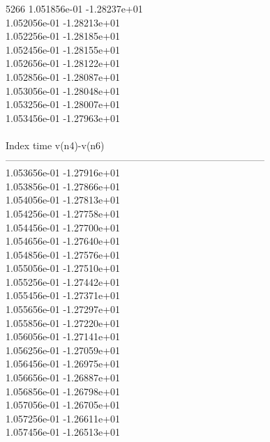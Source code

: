 5266	1.051856e-01	-1.28237e+01	\\ 	1.052056e-01	-1.28213e+01	\\ 	1.052256e-01	-1.28185e+01	\\ 	1.052456e-01	-1.28155e+01	\\ 	1.052656e-01	-1.28122e+01	\\ 	1.052856e-01	-1.28087e+01	\\ 	1.053056e-01	-1.28048e+01	\\ 	1.053256e-01	-1.28007e+01	\\ 	1.053456e-01	-1.27963e+01	\\ \hline
\\ \hline
Index   time            v(n4)-v(n6)     \\ \hline
--------------------------------------------------------------------------------\\ 	1.053656e-01	-1.27916e+01	\\ 	1.053856e-01	-1.27866e+01	\\ 	1.054056e-01	-1.27813e+01	\\ 	1.054256e-01	-1.27758e+01	\\ 	1.054456e-01	-1.27700e+01	\\ 	1.054656e-01	-1.27640e+01	\\ 	1.054856e-01	-1.27576e+01	\\ 	1.055056e-01	-1.27510e+01	\\ 	1.055256e-01	-1.27442e+01	\\ 	1.055456e-01	-1.27371e+01	\\ 	1.055656e-01	-1.27297e+01	\\ 	1.055856e-01	-1.27220e+01	\\ 	1.056056e-01	-1.27141e+01	\\ 	1.056256e-01	-1.27059e+01	\\ 	1.056456e-01	-1.26975e+01	\\ 	1.056656e-01	-1.26887e+01	\\ 	1.056856e-01	-1.26798e+01	\\ 	1.057056e-01	-1.26705e+01	\\ 	1.057256e-01	-1.26611e+01	\\ 	1.057456e-01	-1.26513e+01	\\ \hline
